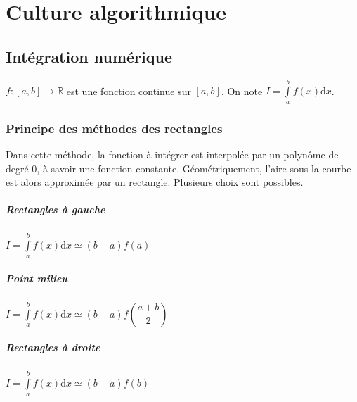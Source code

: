\setchapterpreamble[u]{\margintoc}
\chapter{Culture algorithmique}


\section{Intégration numérique}


\begin{hypo}  $f:[a,b]\rightarrow \mathbb{R}$ est une fonction continue sur $[a,b]$. On note $I = \int\limits_a^{b} f(x) \mathrm{d}x $.
\end{hypo}

\subsection{Principe des méthodes des rectangles}
\begin{defi}
Dans cette méthode, la fonction à intégrer est interpolée par un polynôme de degré 0, à savoir une fonction constante. Géométriquement, l'aire sous la courbe est alors approximée par un rectangle. Plusieurs choix sont possibles.

\paragraph*{Rectangles à gauche}
$I = \int\limits_a^{b} f(x) \mathrm{d}x \simeq \left(b-a\right) f(a) $

\paragraph*{Point milieu}
$I = \int\limits_a^{b} f(x) \mathrm{d}x \simeq \left(b-a\right) f\left(\dfrac{a+b}{2}\right) $

\paragraph*{Rectangles à droite}
$I = \int\limits_a^{b} f(x) \mathrm{d}x \simeq \left(b-a\right) f(b) $

\end{defi}

